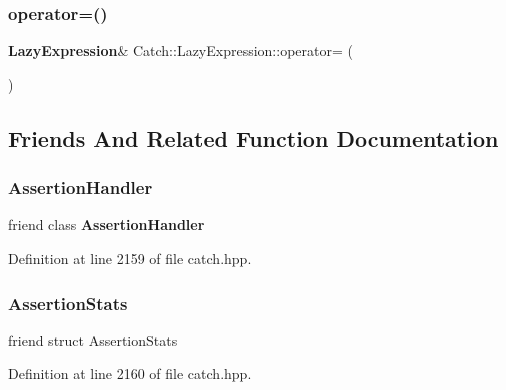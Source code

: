 \mbox{\label{class_catch_1_1_lazy_expression_ae4ae00d4f36f084c369f2da36565a822}} 
\subsubsection{operator=()}
{\footnotesize\ttfamily \textbf{ Lazy\+Expression}\& Catch\+::\+Lazy\+Expression\+::operator= (\begin{DoxyParamCaption}\item[{\textbf{ Lazy\+Expression} const \&}]{ }\end{DoxyParamCaption})\hspace{0.3cm}{\ttfamily [delete]}}



\subsection{Friends And Related Function Documentation}
\mbox{\label{class_catch_1_1_lazy_expression_a4301a3aa57b612dd8b6ef8461742ecab}} 
\subsubsection{AssertionHandler}
{\footnotesize\ttfamily friend class \textbf{ Assertion\+Handler}\hspace{0.3cm}{\ttfamily [friend]}}



Definition at line 2159 of file catch.\+hpp.

\mbox{\label{class_catch_1_1_lazy_expression_a64019eb137f5ce447cdc71cb80b6e7a4}} 
\subsubsection{AssertionStats}
{\footnotesize\ttfamily friend struct Assertion\+Stats\hspace{0.3cm}{\ttfamily [friend]}}



Definition at line 2160 of file catch.\+hpp.

